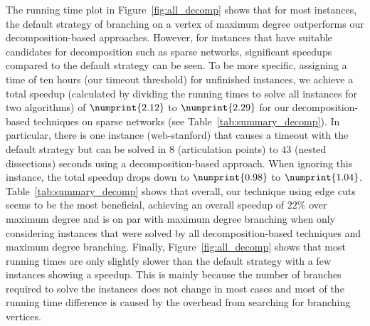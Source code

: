\documentclass[a4paper,UKenglish,cleveref, autoref, thm-restate]{lipics-v2021}
\begin{document}
The running time plot in Figure~\ref{fig:all_decomp} shows that for most instances, the default strategy of branching on a
vertex of maximum degree outperforms our decomposition-based approaches.
However, for instances that have suitable candidates for decomposition such as
sparse networks, significant speedups compared to the default strategy can be
seen. To be more specific, assigning a time of ten hours (our timeout threshold) for unfinished
instances, we achieve a total speedup (calculated by dividing the running times
to solve all instances for two algorithms) of $\numprint{2.12}$ to $\numprint{2.29}$ for our
decomposition-based techniques on sparse networks (see
Table~\ref{tab:summary_decomp}). In particular, there is one instance (web-stanford) that causes a timeout with the
default strategy but can be solved in $8$ (articulation points) to $43$ (nested
dissections) seconds using a decomposition-based approach. When ignoring this instance, the total speedup drops down
to $\numprint{0.98}$ to $\numprint{1.04}$. Table~\ref{tab:summary_decomp} shows that overall, our
technique using edge cuts seems to be the most beneficial, achieving an overall
speedup of $22\%$ over maximum degree and is on par with maximum degree branching
when only considering instances that were solved by all decomposition-based
techniques and maximum degree branching.
Finally, Figure~\ref{fig:all_decomp} shows that most running
times are only slightly slower than the default strategy with a few instances
showing a speedup. This is mainly because
the number of branches required to solve the instances does not change in most
cases and most of the running time
difference is caused by the overhead from
searching for branching vertices.%


\end{document}
